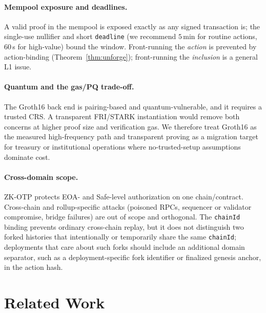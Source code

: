 \documentclass[11pt]{article}
\theoremstyle{definition}
\theoremstyle{plain}
\begin{document}
\paragraph{Mempool exposure and deadlines.} A valid proof in the mempool is exposed
exactly as any signed transaction is; the single-use nullifier and short
\texttt{deadline} (we recommend $5$\,min for routine actions, $60$\,s for high-value)
bound the window. Front-running the \emph{action} is prevented by action-binding
(Theorem~\ref{thm:unforge}); front-running the \emph{inclusion} is a general L1 issue.

\paragraph{Quantum and the gas/PQ trade-off.} The Groth16 back end is pairing-based
and quantum-vulnerable, and it requires a trusted CRS. A transparent FRI/STARK
instantiation would remove both concerns at higher proof size and verification
gas. We therefore treat Groth16 as the measured high-frequency path and transparent
proving as a migration target for treasury or institutional operations where
no-trusted-setup assumptions dominate cost.

\paragraph{Cross-domain scope.} ZK-OTP protects EOA- and Safe-level authorization on
one chain/contract. Cross-chain and rollup-specific attacks (poisoned RPCs, sequencer
or validator compromise, bridge failures) are out of scope and orthogonal. The
\texttt{chainId} binding prevents ordinary cross-chain replay, but it does not
distinguish two forked histories that intentionally or temporarily share the same
\texttt{chainId}; deployments that care about such forks should include an additional
domain separator, such as a deployment-specific fork identifier or finalized genesis
anchor, in the action hash.

\section{Related Work}
\label{sec:related}
\end{document}
